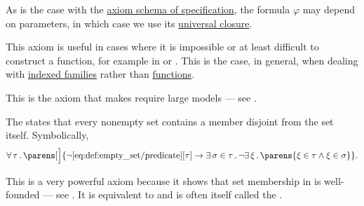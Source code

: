 \begin{definition}
\begin{thmenum}
    As is the case with the \hyperref[def:zfc/specification]{axiom schema of specification}, the formula \( \varphi \) may depend on parameters, in which case we use its \hyperref[thm:implicit_universal_quantification]{universal closure}.

    This axiom is useful in cases where it is impossible or at least difficult to construct a function, for example in  or . This is the case, in general, when dealing with \hyperref[thm:zfc_existence_theorems/indexed_family]{indexed families} rather than \hyperref[def:function]{functions}.

    This is the axiom that makes  require large models --- see .

     The  states that every nonempty set contains a member disjoint from the set itself. Symbolically,
    \begin{equation}\label{eq:def:zfc/foundation}
      \qforall \tau \parens[\Big]
        {
          \neg \ref{eq:def:empty_set/predicate}[\tau]
          \rightarrow
          \qexists {\sigma \in \tau} \neg \qexists \xi \parens{ \xi \in \tau \wedge \xi \in \sigma }
        }.
    \end{equation}

    This is a very powerful axiom because it shows that set membership in  is well-founded --- see . It is equivalent to  and is often itself called the .
  \end{thmenum}
\end{definition}

